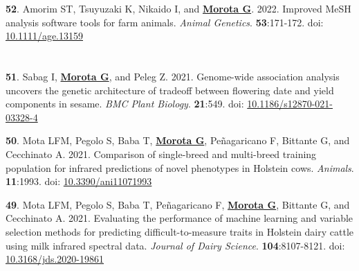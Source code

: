 \documentclass[margin,line,10pt]{res}
\newenvironment{list1}{
  \begin{list}{\ding{113}}{%
      \setlength{\itemsep}{0in}
      \setlength{\parsep}{0in} \setlength{\parskip}{0in}
      \setlength{\topsep}{0in} \setlength{\partopsep}{0in} 
      \setlength{\leftmargin}{0.17in}}}{\end{list}}
\begin{document}
\begin{resume}
\begin{list1}
  \vspace{0.5cm}

             
\item [{\bf 52}.] Amorim ST, Tsuyuzaki K, Nikaido I, and \textbf{\underline{Morota G}}. 2022. Improved MeSH analysis software tools for farm animals.  \emph{Animal Genetics}. \textbf{53}:171-172. doi: \textcolor{blue}{\href{https://doi.org/10.1111/age.13159}{10.1111/age.13159}} 

\end{list1}





\section{}
\begin{list1}

    \item [{\bf 51}.] Sabag I, \textbf{\underline{Morota G}}, and Peleg Z. 2021. Genome-wide association analysis uncovers the genetic architecture of tradeoff between flowering date and yield components in sesame.  \emph{BMC Plant Biology}. \textbf{21}:549. doi: \textcolor{blue}{\href{https://doi.org/10.1186/s12870-021-03328-4}{10.1186/s12870-021-03328-4}} 

      \vspace{0.5cm}

\item [{\bf 50}.] Mota LFM, Pegolo S, Baba T, \textbf{\underline{Morota G}}, Pe\~{n}agaricano F, Bittante G, and Cecchinato A. 2021. Comparison of single-breed and multi-breed training population for infrared predictions of novel phenotypes in Holstein cows. \emph{Animals}. \textbf{11}:1993. doi: \textcolor{blue}{\href{https://doi.org/10.3390/ani11071993}{10.3390/ani11071993}}

      \vspace{0.5cm}
  
\item [{\bf 49}.] Mota LFM, Pegolo S, Baba T, Pe\~{n}agaricano F, \textbf{\underline{Morota G}}, Bittante G, and Cecchinato A. 2021. Evaluating the performance of machine learning and variable selection methods for predicting difficult-to-measure traits in Holstein dairy cattle using milk infrared spectral data. \emph{Journal of Dairy Science}. \textbf{104}:8107-8121. doi: \textcolor{blue}{\href{https://doi.org/10.3168/jds.2020-19861}{10.3168/jds.2020-19861}}

    \vspace{0.5cm}


\end{list1}
\end{resume}
\end{document}
